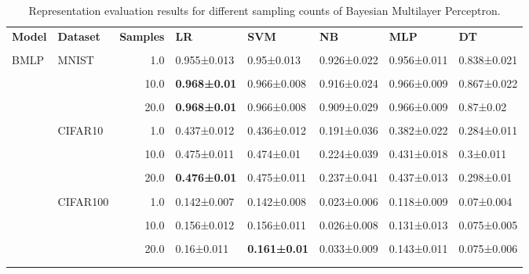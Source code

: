 \begin{table}[]
    \centering
    \footnotesize
    \begin{tabular}{llrlllll}\n\toprule\n \textbf{Model} & \textbf{Dataset}  &  \textbf{Samples} &          \textbf{LR} &         \textbf{SVM} &          \textbf{NB} &         \textbf{MLP} &          \textbf{DT} \\\\\n\midrule\n  BMLP   & MNIST &      1.0 & 0.955±0.013 &  0.95±0.013 & 0.926±0.022 & 0.956±0.011 & 0.838±0.021 \\\\\n    &  &     10.0 &  \textbf{0.968±0.01} & 0.966±0.008 & 0.916±0.024 & 0.966±0.009 & 0.867±0.022 \\\\\n    &  &     20.0 &  \textbf{0.968±0.01} & 0.966±0.008 & 0.909±0.029 & 0.966±0.009 &   0.87±0.02 \\\\\n  & CIFAR10 &      1.0 & 0.437±0.012 & 0.436±0.012 & 0.191±0.036 & 0.382±0.022 & 0.284±0.011 \\\\\n  &  &     10.0 & 0.475±0.011 &  0.474±0.01 & 0.224±0.039 & 0.431±0.018 &   0.3±0.011 \\\\\n  &  &     20.0 &  \textbf{0.476±0.01} & 0.475±0.011 & 0.237±0.041 & 0.437±0.013 &  0.298±0.01 \\\\\n  & CIFAR100 &      1.0 & 0.142±0.007 & 0.142±0.008 & 0.023±0.006 & 0.118±0.009 &  0.07±0.004 \\\\\n  &  &     10.0 & 0.156±0.012 & 0.156±0.011 & 0.026±0.008 & 0.131±0.013 & 0.075±0.005 \\\\\n  &  &     20.0 &  0.16±0.011 &  \textbf{0.161±0.01} & 0.033±0.009 & 0.143±0.011 & 0.075±0.006 \\\\\n\bottomrule\n
    \end{tabular}
    \caption[Representations evaluation for sampling counts of BMLP]{Representation evaluation results for different sampling counts of Bayesian Multilayer Perceptron.}
    \label{tab:bnn_mlp_sampling}
\end{table}